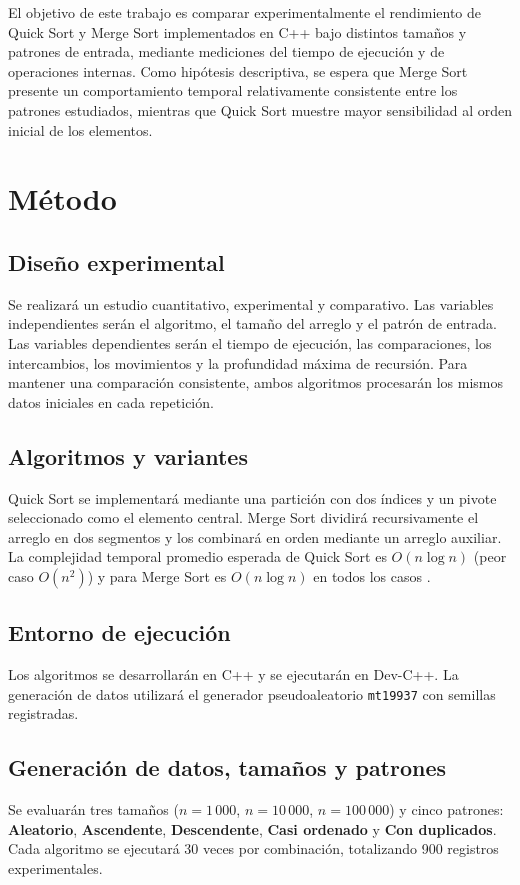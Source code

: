 El objetivo de este trabajo es comparar experimentalmente el rendimiento de Quick Sort y Merge Sort implementados en C++ bajo distintos tamaños y patrones de entrada, mediante mediciones del tiempo de ejecución y de operaciones internas. Como hipótesis descriptiva, se espera que Merge Sort presente un comportamiento temporal relativamente consistente entre los patrones estudiados, mientras que Quick Sort muestre mayor sensibilidad al orden inicial de los elementos.

\section{Método}
\subsection{Diseño experimental}
Se realizará un estudio cuantitativo, experimental y comparativo. Las variables independientes serán el algoritmo, el tamaño del arreglo y el patrón de entrada. Las variables dependientes serán el tiempo de ejecución, las comparaciones, los intercambios, los movimientos y la profundidad máxima de recursión. Para mantener una comparación consistente, ambos algoritmos procesarán los mismos datos iniciales en cada repetición.

\subsection{Algoritmos y variantes}
Quick Sort se implementará mediante una partición con dos índices y un pivote seleccionado como el elemento central. Merge Sort dividirá recursivamente el arreglo en dos segmentos y los combinará en orden mediante un arreglo auxiliar. La complejidad temporal promedio esperada de Quick Sort es \(O(n\log n)\) (peor caso \(O(n^2)\)) y para Merge Sort es \(O(n\log n)\) en todos los casos \parencite{cormen2022}.

\subsection{Entorno de ejecución}
Los algoritmos se desarrollarán en C++ y se ejecutarán en Dev-C++. La generación de datos utilizará el generador pseudoaleatorio \texttt{mt19937} con semillas registradas.

\subsection{Generación de datos, tamaños y patrones}
Se evaluarán tres tamaños (\(n=1\,000\), \(n=10\,000\), \(n=100\,000\)) y cinco patrones: \textbf{Aleatorio}, \textbf{Ascendente}, \textbf{Descendente}, \textbf{Casi ordenado} y \textbf{Con duplicados}. Cada algoritmo se ejecutará 30 veces por combinación, totalizando 900 registros experimentales.

